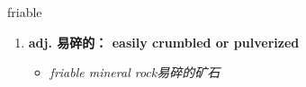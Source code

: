
\begin{frame}
{\huge friable}
\begin{center}
\begin{enumerate}\Large
  \item \textbf{adj. 易碎的： easily crumbled or pulverized}
  \begin{itemize}
    \item \em{\Large{friable mineral rock易碎的矿石}}
  \end{itemize}
\end{enumerate}
\end{center}
\end{frame}
